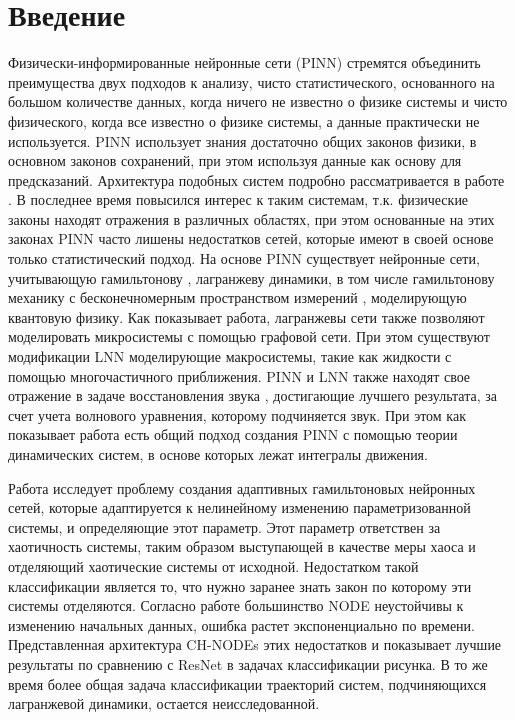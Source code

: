 \documentclass[12pt, twoside]{article}
\begin{document}
\maketitle
\section{Введение}\label{sec:introduction}

Физически-информированные нейронные сети (PINN) стремятся объединить преимущества двух подходов к анализу, чисто статистического, основанного на большом количестве данных, когда ничего не известно о физике системы и чисто физического, когда все известно о физике системы, а данные практически не используется. PINN использует знания достаточно общих законов физики, в основном законов сохранений, при этом используя данные как основу для предсказаний. Архитектура подобных систем подробно рассматривается в работе \cite{PINNreview}. В последнее время повысился интерес к таким системам, т.к. физические законы находят отражения в различных областях, при этом основанные на этих законах PINN часто лишены недостатков сетей, которые имеют в своей основе только статистический подход. На основе PINN существует нейронные сети, учитывающую гамильтонову \cite{HNN}, лагранжеву динамики\cite{article}, в том числе гамильтонову механику с бесконечномерным пространством измерений \cite{quantumHNN}, моделирующую квантовую физику. Как показывает работа, лагранжевы сети также позволяют моделировать микросистемы с помощью графовой сети. При этом существуют модификации LNN моделирующие макросистемы, такие как жидкости с помощью многочастичного приближения. PINN и LNN также находят свое отражение в задаче восстановления звука \cite{PINNsoundwave}, достигающие лучшего результата, за счет учета волнового уравнения, которому подчиняется звук. При этом как показывает работа есть общий подход создания PINN с помощью теории динамических систем, в основе которых лежат интегралы движения.

Работа \cite{HNNadapt} исследует проблему создания адаптивных гамильтоновых нейронных сетей, которые адаптируется к нелинейному изменению параметризованной системы, и определяющие этот параметр. Этот параметр ответствен за хаотичность системы, таким образом выступающей в качестве меры хаоса и отделяющий хаотические системы от исходной. Недостатком такой классификации является то, что нужно заранее знать закон по которому эти системы отделяются. Согласно работе \cite{HNNrobustclass} большинство NODE неустойчивы к изменению начальных данных, ошибка растет экспоненциально по времени. Представленная архитектура CH-NODEs этих недостатков и показывает лучшие результаты по сравнению с ResNet в задачах классификации рисунка. В то же время более общая задача классификации траекторий систем, подчиняющихся лагранжевой динамики, остается неисследованной. 
\end{document}
